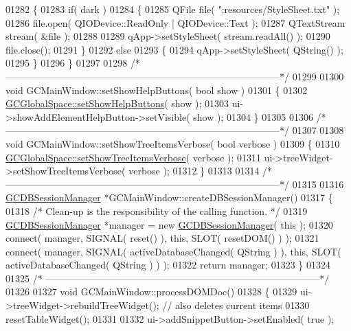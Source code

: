 \begin{DoxyCode}
{{{{{{{01282 \{
01283   \textcolor{keywordflow}{if}( dark )
01284   \{
01285     QFile file( \textcolor{stringliteral}{":resources/StyleSheet.txt"} );
01286     file.open( QIODevice::ReadOnly | QIODevice::Text );
01287     QTextStream stream( &file );
01288 
01289     qApp->setStyleSheet( stream.readAll() );
01290     file.close();
01291   \}
01292   \textcolor{keywordflow}{else}
01293   \{
01294     qApp->setStyleSheet( QString() );
01295   \}
01296 \}
01297 
01298 \textcolor{comment}{/*
      --------------------------------------------------------------------------------------*/}
01299 
01300 \textcolor{keywordtype}{void} GCMainWindow::setShowHelpButtons( \textcolor{keywordtype}{bool} show )
01301 \{
01302   \hyperlink{namespace_g_c_global_space_a6395acc08160e411395f96a88793eacc}{GCGlobalSpace::setShowHelpButtons}( show );
01303   ui->showAddElementHelpButton->setVisible( show );
01304 \}
01305 
01306 \textcolor{comment}{/*
      --------------------------------------------------------------------------------------*/}
01307 
01308 \textcolor{keywordtype}{void} GCMainWindow::setShowTreeItemsVerbose( \textcolor{keywordtype}{bool} verbose )
01309 \{
01310   \hyperlink{namespace_g_c_global_space_a58bc4fea7a061440f9ef2dd0aca8aba5}{GCGlobalSpace::setShowTreeItemsVerbose}( verbose );
01311   ui->treeWidget->setShowTreeItemsVerbose( verbose );
01312 \}
01313 
01314 \textcolor{comment}{/*
      --------------------------------------------------------------------------------------*/}
01315 
01316 \hyperlink{class_g_c_d_b_session_manager}{GCDBSessionManager} *GCMainWindow::createDBSessionManager()
01317 \{
01318   \textcolor{comment}{/* Clean-up is the responsibility of the calling function. */}
01319   \hyperlink{class_g_c_d_b_session_manager}{GCDBSessionManager} *manager = \textcolor{keyword}{new} \hyperlink{class_g_c_d_b_session_manager}{GCDBSessionManager}( \textcolor{keyword}{this} );
01320   connect( manager, SIGNAL( reset() ), \textcolor{keyword}{this}, SLOT( resetDOM() ) );
01321   connect( manager, SIGNAL( activeDatabaseChanged( QString ) ), \textcolor{keyword}{this}, SLOT( 
      activeDatabaseChanged( QString ) ) );
01322   \textcolor{keywordflow}{return} manager;
01323 \}
01324 
01325 \textcolor{comment}{/*
      --------------------------------------------------------------------------------------*/}
01326 
01327 \textcolor{keywordtype}{void} GCMainWindow::processDOMDoc()
01328 \{
01329   ui->treeWidget->rebuildTreeWidget(); \textcolor{comment}{// also deletes current items}
01330   resetTableWidget();
01331 
01332   ui->addSnippetButton->setEnabled( \textcolor{keyword}{true} );
}}}}}}}
\end{DoxyCode}
